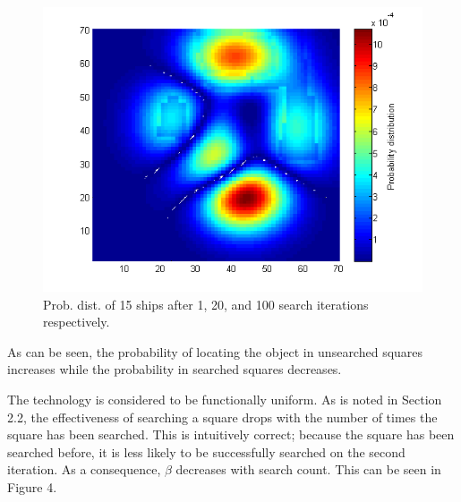 \documentclass[a4paper]{article}
\begin{document}
\begin{figure}[H]
\begin{center}
\includegraphics[scale=0.35]{../Matlab/Images/ModelSearch100.png}
\caption{Prob. dist. of 15 ships after 1, 20, and 100 search iterations respectively.}
\end{center}\end{figure}

As can be seen, the probability of locating the object in unsearched squares increases while the probability in searched squares decreases. 

The technology is considered to be functionally uniform. As is noted in Section 2.2, the effectiveness of searching a square drops with the number of times the square has been searched. This is intuitively correct; because the square has been searched before, it is less likely to be successfully searched on the second iteration. As a consequence, $\beta$ decreases with search count. This can be seen in Figure 4.
\end{document}
